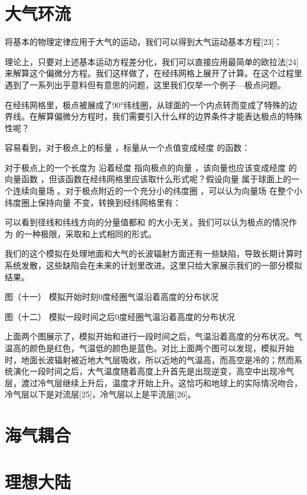 \documentclass[a4paper,10.5pt]{book}
\begin{document}
\section{大气环流}

将基本的物理定律应用于大气的运动，我们可以得到大气运动基本方程[23]：



理论上，只要对上述基本运动方程差分化，我们可以直接应用最简单的欧拉法[24]来解算这个偏微分方程。我们这样做了，在经纬网格上展开了计算。在这个过程里遇到了一系列出乎意料但有意思的问题，这里我们仅举一个例子—极点问题。

在经纬网格里，极点被展成了90°纬线圈，从球面的一个内点转而变成了特殊的边界线。在解算偏微分方程时，我们需要引入什么样的边界条件才能表达极点的特殊性呢？

容易看到，对于极点上的标量  ，标量从一个点值变成经度  的函数：



对于极点上的一个长度为  沿着经度  指向极点的向量  ，该向量也应该变成经度  的向量函数  ，但该函数在经纬网格里应该取什么形式呢？假设向量  属于球面上的一个连续向量场  。对于极点附近的一个充分小的纬度圈 ，可以认为向量场  在整个小纬度圈上保持向量  不变，转换到经纬网格里有：



可以看到径线和纬线方向的分量值都和  的大小无关。我们可以认为极点的情况作为  的一种极限，采取和上式相同的形式。

我们的这个模拟在处理地面和大气的长波辐射方面还有一些缺陷，导致长期计算时系统发散，这些缺陷会在未来的计划里改进。这里只给大家展示我们的一部分模拟结果。


图（十一）
模拟开始时刻0度经圈气温沿着高度的分布状况



图（十二）
模拟一段时间之后0度经圈气温沿着高度的分布状况

上面两个图展示了，模拟开始和进行一段时间之后，气温沿着高度的分布状况。气温高的颜色是红色，气温低的颜色是蓝色。对比上面两个图可以发现，模拟开始时，地面长波辐射被近地大气层吸收，所以近地的气温高，而高空是冷的；然而系统演化一段时间之后，大气温度随着高度上升首先是出现逆变，高空中出现冷气层，渡过冷气层继续上升后，温度才开始上升。这恰巧和地球上的实际情况吻合，冷气层以下是对流层[25]，冷气层以上是平流层[26]。

\section{海气耦合}

\section{理想大陆}
\end{document}
